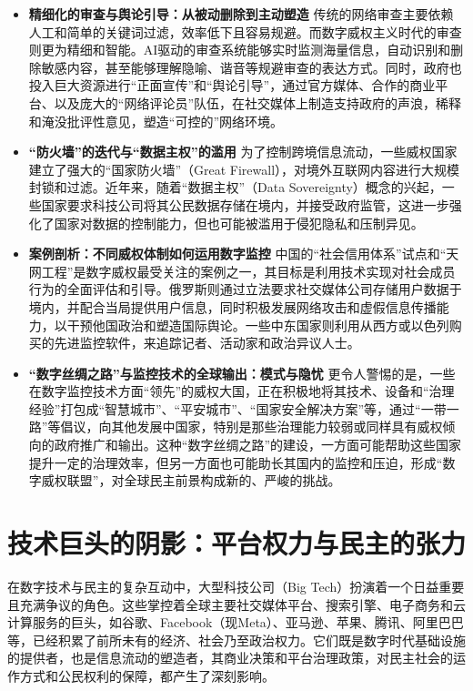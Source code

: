 \documentclass[UTF8, 10pt]{ctexbook}
\begin{document}
\begin{itemize}
    \item \textbf{精细化的审查与舆论引导：从被动删除到主动塑造}
    传统的网络审查主要依赖人工和简单的关键词过滤，效率低下且容易规避。而数字威权主义时代的审查则更为精细和智能。AI驱动的审查系统能够实时监测海量信息，自动识别和删除敏感内容，甚至能够理解隐喻、谐音等规避审查的表达方式。同时，政府也投入巨大资源进行“正面宣传”和“舆论引导”，通过官方媒体、合作的商业平台、以及庞大的“网络评论员”队伍，在社交媒体上制造支持政府的声浪，稀释和淹没批评性意见，塑造“可控的”网络环境。

    \item \textbf{“防火墙”的迭代与“数据主权”的滥用}
    为了控制跨境信息流动，一些威权国家建立了强大的“国家防火墙”（Great Firewall），对境外互联网内容进行大规模封锁和过滤。近年来，随着“数据主权”（Data Sovereignty）概念的兴起，一些国家要求科技公司将其公民数据存储在境内，并接受政府监管，这进一步强化了国家对数据的控制能力，但也可能被滥用于侵犯隐私和压制异见。

    \item \textbf{案例剖析：不同威权体制如何运用数字监控}
    中国的“社会信用体系”试点和“天网工程”是数字威权最受关注的案例之一，其目标是利用技术实现对社会成员行为的全面评估和引导。俄罗斯则通过立法要求社交媒体公司存储用户数据于境内，并配合当局提供用户信息，同时积极发展网络攻击和虚假信息传播能力，以干预他国政治和塑造国际舆论。一些中东国家则利用从西方或以色列购买的先进监控软件，来追踪记者、活动家和政治异议人士。

    \item \textbf{“数字丝绸之路”与监控技术的全球输出：模式与隐忧}
    更令人警惕的是，一些在数字监控技术方面“领先”的威权大国，正在积极地将其技术、设备和“治理经验”打包成“智慧城市”、“平安城市”、“国家安全解决方案”等，通过“一带一路”等倡议，向其他发展中国家，特别是那些治理能力较弱或同样具有威权倾向的政府推广和输出。这种“数字丝绸之路”的建设，一方面可能帮助这些国家提升一定的治理效率，但另一方面也可能助长其国内的监控和压迫，形成“数字威权联盟”，对全球民主前景构成新的、严峻的挑战。
\end{itemize}

\section{技术巨头的阴影：平台权力与民主的张力}
\lettrine[lines=2]{在}{数字技术}与民主的复杂互动中，大型科技公司（Big Tech）扮演着一个日益重要且充满争议的角色。这些掌控着全球主要社交媒体平台、搜索引擎、电子商务和云计算服务的巨头，如谷歌、Facebook（现Meta）、亚马逊、苹果、腾讯、阿里巴巴等，已经积累了前所未有的经济、社会乃至政治权力。它们既是数字时代基础设施的提供者，也是信息流动的塑造者，其商业决策和平台治理政策，对民主社会的运作方式和公民权利的保障，都产生了深刻影响。
\end{document}
